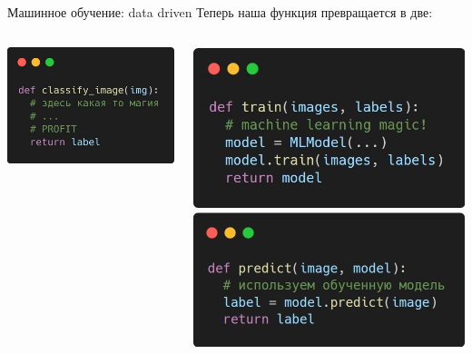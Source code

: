 \documentclass[aspectratio=169, professionalfonts]{beamer}
\begin{document}
\begin{frame}{Машинное обучение: data driven}
    \centering
    Теперь наша функция превращается в две:
    \begin{columns}[T]
        \begin{column}{.4\linewidth}
            \centering
            \includegraphics[width=\linewidth]{graphs/fig9_2.jpg}
        \end{column}
        \begin{column}{.6\linewidth}
            \centering
            \includegraphics[width=.64\linewidth]{graphs/fig18_1.jpg}
            \includegraphics[width=.64\linewidth]{graphs/fig18_2.jpg}
        \end{column}
    \end{columns}
\end{frame}
\end{document}
